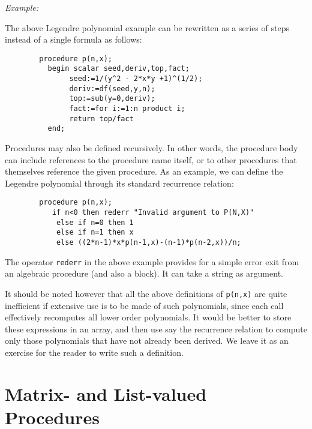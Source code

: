 \textit{Example:}

The above Legendre polynomial example can be rewritten as a series of steps
instead of a single formula as follows:
\begin{verbatim}
        procedure p(n,x);
          begin scalar seed,deriv,top,fact;
               seed:=1/(y^2 - 2*x*y +1)^(1/2);
               deriv:=df(seed,y,n);
               top:=sub(y=0,deriv);
               fact:=for i:=1:n product i;
               return top/fact
          end;
\end{verbatim}
Procedures may also be defined recursively.  In other words, the procedure
body can include references to the procedure name
itself, or to other procedures that themselves reference the given
procedure.  As an example, we can define the Legendre polynomial through
its standard recurrence relation:
\begin{verbatim}
        procedure p(n,x);
           if n<0 then rederr "Invalid argument to P(N,X)"
            else if n=0 then 1
            else if n=1 then x
            else ((2*n-1)*x*p(n-1,x)-(n-1)*p(n-2,x))/n;
\end{verbatim}

\hypertarget{operator:REDERR}{}
The operator \texttt{rederr} in the above example provides
for a simple error exit from an algebraic procedure (and also a block).
It can take a string as argument.

It should be noted however that all the above definitions of \texttt{p(n,x)} are
quite inefficient if extensive use is to be made of such polynomials, since
each call effectively recomputes all lower order polynomials. It would be
better to store these expressions in an array, and then use say the
recurrence relation to compute only those polynomials that have not already
been derived. We leave it as an exercise for the reader to write such a
definition.

\section{Matrix- and List-valued Procedures}
\hypertarget{reserved:MATRIXPROC}{}

